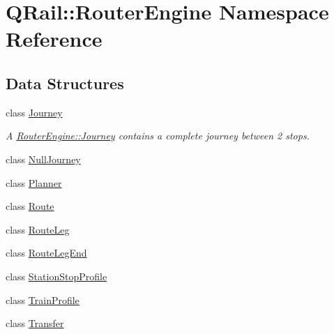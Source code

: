 \hypertarget{namespaceQRail_1_1RouterEngine}{}\section{Q\+Rail\+::Router\+Engine Namespace Reference}
\label{namespaceQRail_1_1RouterEngine}
\subsection*{Data Structures}
\begin{DoxyCompactItemize}
\item 
class \mbox{\hyperlink{classQRail_1_1RouterEngine_1_1Journey}{Journey}}
\begin{DoxyCompactList}\small\item\em A \mbox{\hyperlink{classQRail_1_1RouterEngine_1_1Journey}{Router\+Engine\+::\+Journey}} contains a complete journey between 2 stops. \end{DoxyCompactList}\item 
class \mbox{\hyperlink{classQRail_1_1RouterEngine_1_1NullJourney}{Null\+Journey}}
\item 
class \mbox{\hyperlink{classQRail_1_1RouterEngine_1_1Planner}{Planner}}
\item 
class \mbox{\hyperlink{classQRail_1_1RouterEngine_1_1Route}{Route}}
\item 
class \mbox{\hyperlink{classQRail_1_1RouterEngine_1_1RouteLeg}{Route\+Leg}}
\item 
class \mbox{\hyperlink{classQRail_1_1RouterEngine_1_1RouteLegEnd}{Route\+Leg\+End}}
\item 
class \mbox{\hyperlink{classQRail_1_1RouterEngine_1_1StationStopProfile}{Station\+Stop\+Profile}}
\item 
class \mbox{\hyperlink{classQRail_1_1RouterEngine_1_1TrainProfile}{Train\+Profile}}
\item 
class \mbox{\hyperlink{classQRail_1_1RouterEngine_1_1Transfer}{Transfer}}
\end{DoxyCompactItemize}
